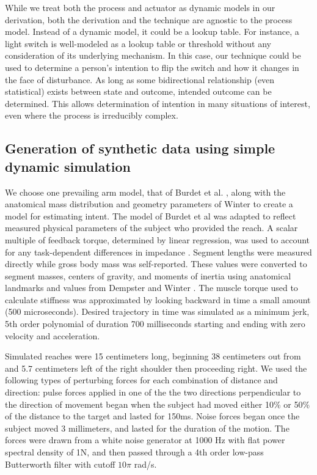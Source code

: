 \documentclass[10pt]{article}
\begin{document}
While we treat both the process and actuator as dynamic models in our derivation, both the derivation and the technique are agnostic to the process model. Instead of a dynamic model, it could be a lookup table. For instance, a light switch is well-modeled as a lookup table or threshold without any consideration of its underlying mechanism. In this case, our technique could be used to determine a person's intention to flip the switch and how it changes in the face of disturbance. As long as some bidirectional relationship (even statistical) exists between state and outcome, intended outcome can be determined. This allows determination of intention in many situations of interest, even where the process is irreducibly complex.

\subsection*{Generation of synthetic data using simple dynamic simulation}
We choose one prevailing arm model, that of Burdet et al. \cite{burdet2006stability}, along with the anatomical mass distribution and geometry parameters of Winter \cite{winter2009biomechanics} to create a model for estimating intent. The model of Burdet et al \cite{burdet2006stability} was adapted to reflect measured physical parameters of the subject who provided the reach. A scalar multiple of feedback torque, determined by linear regression, was used to account for any task-dependent differences in impedance \cite{franklin2003adaptation}. Segment lengths were measured directly while gross body mass was self-reported. These values were converted to segment masses, centers of gravity, and moments of inertia using anatomical landmarks and values from Dempster \cite{dempster1955space} and Winter \cite{winter2009biomechanics}. The muscle torque used to calculate stiffness was approximated by looking backward in time a small amount (500 microseconds). Desired trajectory in time was simulated as a minimum jerk, 5th order polynomial of duration 700 milliseconds starting and ending with zero velocity and acceleration.

Simulated reaches were 15 centimeters long, beginning 38 centimeters out from and 5.7 centimeters left of the right shoulder then proceeding right.  We used the following types of perturbing forces for each combination of distance and direction: 
pulse forces applied in one of the the two directions perpendicular to the direction of movement began when the subject had moved either 10\% or 50\% of the distance to the target and lasted for 150ms.
Noise forces began once the subject moved 3 millimeters, and lasted for the duration of the motion. The forces were drawn from a white noise generator at 1000 Hz with flat power spectral density of 1N, and then passed through a 4th order low-pass Butterworth filter with cutoff $10\pi$ rad/s. 
\end{document}
